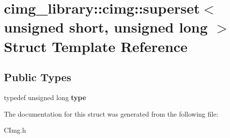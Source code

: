 \hypertarget{structcimg__library_1_1cimg_1_1superset_3_01unsigned_01short_00_01unsigned_01long_01_4}{\section{cimg\-\_\-library\-:\-:cimg\-:\-:superset$<$ unsigned short, unsigned long $>$ Struct Template Reference}
\label{structcimg__library_1_1cimg_1_1superset_3_01unsigned_01short_00_01unsigned_01long_01_4}
}
\subsection*{Public Types}
\begin{DoxyCompactItemize}
\item 
\hypertarget{structcimg__library_1_1cimg_1_1superset_3_01unsigned_01short_00_01unsigned_01long_01_4_af88ce34cb96d91368352fbe9a67917d8}{typedef unsigned long {\bfseries type}}\label{structcimg__library_1_1cimg_1_1superset_3_01unsigned_01short_00_01unsigned_01long_01_4_af88ce34cb96d91368352fbe9a67917d8}

\end{DoxyCompactItemize}


The documentation for this struct was generated from the following file\-:\begin{DoxyCompactItemize}
\item 
C\-Img.\-h\end{DoxyCompactItemize}
